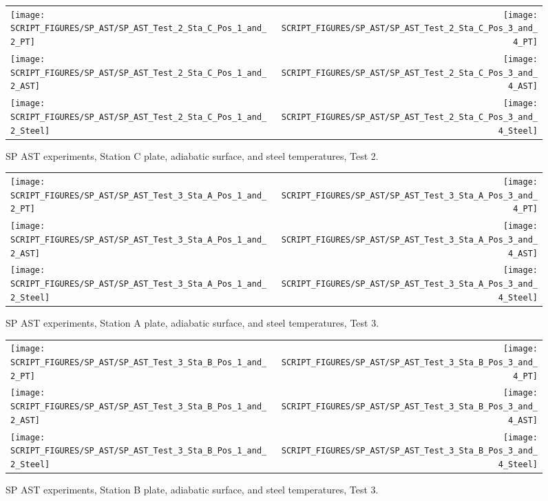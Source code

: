 \begin{figure}[p]
\begin{tabular*}{\textwidth}{l@{\extracolsep{\fill}}r}
\texttt{[image: SCRIPT\_FIGURES/SP\_AST/SP\_AST\_Test\_2\_Sta\_C\_Pos\_1\_and\_2\_PT]} &
\texttt{[image: SCRIPT\_FIGURES/SP\_AST/SP\_AST\_Test\_2\_Sta\_C\_Pos\_3\_and\_4\_PT]} \\
\texttt{[image: SCRIPT\_FIGURES/SP\_AST/SP\_AST\_Test\_2\_Sta\_C\_Pos\_1\_and\_2\_AST]} &
\texttt{[image: SCRIPT\_FIGURES/SP\_AST/SP\_AST\_Test\_2\_Sta\_C\_Pos\_3\_and\_4\_AST]} \\
\texttt{[image: SCRIPT\_FIGURES/SP\_AST/SP\_AST\_Test\_2\_Sta\_C\_Pos\_1\_and\_2\_Steel]} &
\texttt{[image: SCRIPT\_FIGURES/SP\_AST/SP\_AST\_Test\_2\_Sta\_C\_Pos\_3\_and\_4\_Steel]}
\end{tabular*}
\caption{SP AST experiments, Station C plate, adiabatic surface, and steel temperatures, Test 2.}
\label{SP_Test_2_Station_C}
\end{figure}


\begin{figure}[p]
\begin{tabular*}{\textwidth}{l@{\extracolsep{\fill}}r}
\texttt{[image: SCRIPT\_FIGURES/SP\_AST/SP\_AST\_Test\_3\_Sta\_A\_Pos\_1\_and\_2\_PT]} &
\texttt{[image: SCRIPT\_FIGURES/SP\_AST/SP\_AST\_Test\_3\_Sta\_A\_Pos\_3\_and\_4\_PT]} \\
\texttt{[image: SCRIPT\_FIGURES/SP\_AST/SP\_AST\_Test\_3\_Sta\_A\_Pos\_1\_and\_2\_AST]} &
\texttt{[image: SCRIPT\_FIGURES/SP\_AST/SP\_AST\_Test\_3\_Sta\_A\_Pos\_3\_and\_4\_AST]} \\
\texttt{[image: SCRIPT\_FIGURES/SP\_AST/SP\_AST\_Test\_3\_Sta\_A\_Pos\_1\_and\_2\_Steel]} &
\texttt{[image: SCRIPT\_FIGURES/SP\_AST/SP\_AST\_Test\_3\_Sta\_A\_Pos\_3\_and\_4\_Steel]}
\end{tabular*}
\caption{SP AST experiments, Station A plate, adiabatic surface, and steel temperatures, Test 3.}
\label{SP_Test_3_Station_A}
\end{figure}

\begin{figure}[p]
\begin{tabular*}{\textwidth}{l@{\extracolsep{\fill}}r}
\texttt{[image: SCRIPT\_FIGURES/SP\_AST/SP\_AST\_Test\_3\_Sta\_B\_Pos\_1\_and\_2\_PT]} &
\texttt{[image: SCRIPT\_FIGURES/SP\_AST/SP\_AST\_Test\_3\_Sta\_B\_Pos\_3\_and\_4\_PT]} \\
\texttt{[image: SCRIPT\_FIGURES/SP\_AST/SP\_AST\_Test\_3\_Sta\_B\_Pos\_1\_and\_2\_AST]} &
\texttt{[image: SCRIPT\_FIGURES/SP\_AST/SP\_AST\_Test\_3\_Sta\_B\_Pos\_3\_and\_4\_AST]} \\
\texttt{[image: SCRIPT\_FIGURES/SP\_AST/SP\_AST\_Test\_3\_Sta\_B\_Pos\_1\_and\_2\_Steel]} &
\texttt{[image: SCRIPT\_FIGURES/SP\_AST/SP\_AST\_Test\_3\_Sta\_B\_Pos\_3\_and\_4\_Steel]}
\end{tabular*}
\caption{SP AST experiments, Station B plate, adiabatic surface, and steel temperatures, Test 3.}
\label{SP_Test_3_Station_B}
\end{figure}

